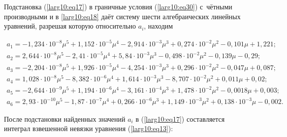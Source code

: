 


Подстановка (\ref{larg10:eq17}) в граничные условия (\ref{larg10:eq30}) с~чётными производными  и в \eqref{larg10:eq18}  даёт систему шести алгебраических линейных уравнений, разрешая которую относительно $a_i$, находим

$$

\begin{array}{l}

a_1 {=} {-}1,234 {\cdot }10^{-8} \mu^5 + 1,152 {\cdot} 10^{-5} \mu^4 - 2,914 {\cdot}

10^{-3} \mu^3 + 0,274 {\cdot} 10^{-2} \mu^2 - 0,101 \mu + 1,221;\\

a_2 {=} 2,644 {\cdot} 10^{-8}\mu^5 - 2,41 {\cdot} 10^{-5}\mu ^4{+}5,84{\cdot} 10^{-3}\mu

^3{-}0,498{\cdot} 10^{-2}\mu ^2{-}0,139\mu {-}0,29;\\

a_3 {=} {-}2,204\cdot 10^{-8}\mu ^5{+}1,926{\cdot} 10^{-5}\mu ^4{-}4,254{\cdot}

10^{-3}\mu ^3{+}0,296{\cdot} 10^{-2}\mu ^2{-}0,047\mu {+}0,087;\\

a_4{=}1,028{\cdot}10^{-8}\mu ^5{-}8,382{\cdot} 10^{-6}\mu ^4{+}1,614{\cdot} 10^{-3}\mu

^3{-}8,707{\cdot} 10^{-2}\mu ^2{+}0,011\mu {+}0,02;\\

a_5 {=} {-}2,644\cdot 10^{-9}\mu ^5{+}1,194{\cdot} 10^{-6}\mu ^4{-}3,161{\cdot}

10^{-4}\mu ^3{+}1,478{\cdot} 10^{-2}\mu ^2{-}0,0018\mu{ +}0,003;\\

a_6 {=}2,93{\cdot} 10^{-10}\mu ^5{-}1,87{\cdot}10^{-7}\mu ^4{+}0,266{\cdot} 10^{-6}\mu

^3{+}1,149{\cdot} 10^{-3}\mu ^2{+}0,138{\cdot}10^{-3}\mu {-}0,002.

\end{array}

$$



После подстановки найденных значений $a_i$ в (\ref{larg10:eq17}) составляется интеграл взвешенной невязки уравнения (\ref{larg10:eq13}):

